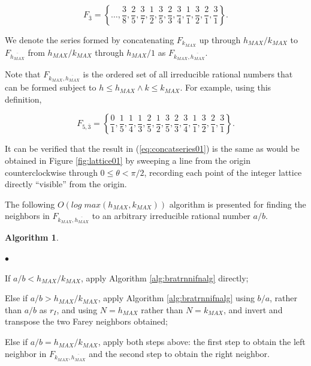\documentclass{esub2acm}
\newtheorem{algorithm}{Algorithm}
\newenvironment{alglvl0}{\begin{list}
               {$\bullet$}{\setlength{\labelwidth}{3mm}\setlength{\leftmargin}{6mm}}}
               {\end{list}}
\begin{document}
\begin{equation}
F_{\overline{3}} =
\left\{
\ldots{},
\frac{3}{8}, \frac{2}{5}, \frac{3}{7},
\frac{1}{2}, \frac{3}{5}, \frac{2}{3}, \frac{3}{4},
\frac{1}{1}, \frac{3}{2}, \frac{2}{1}, \frac{3}{1}
\right\}.
\end{equation}

We denote the series formed by concatenating $F_{k_{MAX}}$ up through
$h_{MAX}/k_{MAX}$ to $F_{\overline{h_{MAX}}}$ from $h_{MAX}/k_{MAX}$
through $h_{MAX}/1$ as $F_{k_{MAX}, \overline{h_{MAX}}}$.

Note that
$F_{k_{MAX}, \overline{h_{MAX}}}$ is the ordered set of all
irreducible rational numbers that can be formed subject to
$h \leq h_{MAX} \wedge k \leq k_{MAX}$.  For example, using this
definition,

\begin{equation}
\label{eq:concatseries01}
F_{5, \overline{3}} =
\left\{
\frac{0}{1}, \frac{1}{5}, \frac{1}{4}, \frac{1}{3},
\frac{2}{5}, \frac{1}{2}, \frac{3}{5},
\frac{2}{3}, \frac{3}{4},
\frac{1}{1}, \frac{3}{2}, \frac{2}{1}, \frac{3}{1}
\right\}.
\end{equation}

It can be verified that the result in (\ref{eq:concatseries01}) is the same
as would be obtained in Figure \ref{fig:lattice01} by sweeping a
line from the origin counterclockwise through $0 \leq \theta < \pi/2$, recording
each point of the integer lattice directly ``visible'' from the origin.

The following $O(log \; max(h_{MAX}, k_{MAX}))$ algorithm is presented
for finding the neighbors in $F_{k_{MAX}, \overline{h_{MAX}}}$ to
an arbitrary irreducible rational number $a/b$.

\begin{algorithm}\label{alg:rectangular}\end{algorithm}
\begin{alglvl0}
\item If $a/b < h_{MAX}/k_{MAX}$, apply Algorithm \ref{alg:bratrnnifnalg}
      directly;
\item Else if $a/b > h_{MAX}/k_{MAX}$, apply Algorithm \ref{alg:bratrnnifnalg}
      using $b/a$, rather than $a/b$ as $r_I$, and using $N=h_{MAX}$ rather than
      $N=k_{MAX}$, and invert and transpose the two
      Farey neighbors obtained;
\item Else if $a/b = h_{MAX}/k_{MAX}$, apply both steps above:  the first step
      to obtain the left neighbor in $F_{k_{MAX}, \overline{h_{MAX}}}$
      and the second step to obtain the right
      neighbor.
\end{alglvl0}
\end{document}
